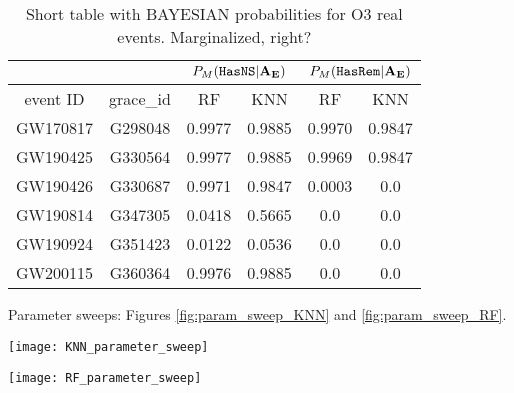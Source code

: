 \begin{table}[]
\begin{tabular}{c|c|cc|cc}
\hline
\multicolumn{1}{c|}{}         & \multicolumn{1}{l|}{} & \multicolumn{2}{c|}{$P_M({{\tt HasNS}}|{\bf A}_{\bf E})$}                                                & \multicolumn{2}{c}{$P_M({{\tt HasRem}}|{\bf A}_{\bf E})$}                                                \\ \hline
\multicolumn{1}{c|}{event ID} & grace\_id             & \multicolumn{1}{c}{RF} & \multicolumn{1}{c}{KNN}  & \multicolumn{1}{c}{RF} & \multicolumn{1}{c}{KNN} \\ \hline
GW170817                      & G298048               & 0.9977                   & 0.9885                    & 0.9970                   & 0.9847                                  \\
GW190425                      & G330564               & 0.9977                   & 0.9885                    & 0.9969                   & 0.9847                             \\
GW190426                      & G330687               & 0.9971                   & 0.9847                    & 0.0003                   & 0.0                     \\
GW190814                      & G347305               & 0.0418                   & 0.5665                   & 0.0                  & 0.0                      \\
GW190924                      & G351423               & 0.0122                   & 0.0536                   & 0.0                   & 0.0                       \\               
GW200115                      & G360364               & 0.9976                   & 0.9885                   & 0.0                  & 0.0                           \\
\hline
\end{tabular}
\caption{Short table with BAYESIAN probabilities for O3 real events. Marginalized, right? }
\label{tab:real_data_bayesian}
\end{table}


Parameter sweeps:  Figures \ref{fig:param_sweep_KNN} and \ref{fig:param_sweep_RF}.

\begin{figure*}[h]
\texttt{[image: KNN\_parameter\_sweep]}
\caption{\label{fig:param_sweep_KNN}.}
\end{figure*}

\begin{figure*}[h]
\texttt{[image: RF\_parameter\_sweep]}
\caption{\label{fig:param_sweep_RF}.}
\end{figure*}


